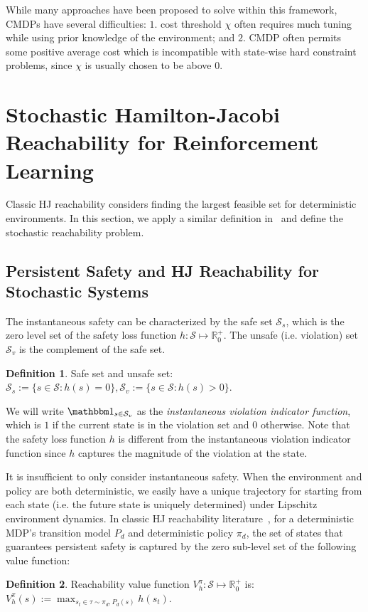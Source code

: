 \documentclass{article}
\theoremstyle{definition}
\newtheorem{definition}{Definition}
\begin{document}
While many approaches have been proposed to solve within this framework, CMDPs have several difficulties: $1.$ cost threshold $\chi$ often requires much tuning while using prior knowledge of the environment; and $2.$ CMDP often permits some positive average cost which is incompatible with state-wise hard constraint problems, since $\chi$ is usually chosen to be above 0.

\vspace{-5pt}
\section{Stochastic Hamilton-Jacobi Reachability for Reinforcement Learning}

Classic HJ reachability considers finding the largest feasible set for deterministic environments. In this section, we apply a similar definition in~\cite{abate2008probabilistic,summers2010verification} and define the stochastic reachability problem.
\subsection{Persistent Safety and HJ Reachability for Stochastic Systems}
\label{section:Feasibility}


The instantaneous safety can be characterized by the safe set $\mathcal S_s$, which is the zero level set of the safety loss function $h: \mathcal S \mapsto \mathbb R^+_0$. The unsafe (i.e. violation) set $\mathcal S_v$ is the complement of the safe set. 
\begin{definition} Safe set and unsafe set: $\mathcal S_{s}:= \{ s \in \mathcal S: h(s) = 0 \},  \mathcal S_{v}:= \{ s \in \mathcal S: h(s) > 0 \}$.

\end{definition} 
\vspace{-5pt}
We will write $\mathbbm 1_{s\in \mathcal S_v}$ as the {\em instantaneous violation indicator function}, which is $1$ if the current state is in the violation set and $0$ otherwise. Note that the safety loss function $h$ is different from the instantaneous violation indicator function since $h$ captures the magnitude of the violation at the state.


It is insufficient to only consider instantaneous safety. When the environment and policy are both deterministic, we easily have a unique trajectory for starting from each state (i.e. the future state is uniquely determined) under Lipschitz environment dynamics. In classic HJ reachability literature~\cite{hjreachabilityoverview}, for a deterministic MDP's transition model $P_d$ and deterministic policy $\pi_d$, the set of states that guarantees persistent safety is captured by the zero sub-level set of the following value function: 
\begin{definition}
    Reachability value function $V_h^\pi : \mathcal S \mapsto \mathbb R^+_0$ is: $V_h^\pi (s) := \max_{s_t\in \tau \sim \pi_d,P_d(s)} h(s_t)$.
\end{definition}
\vspace{-5pt}
\end{document}
